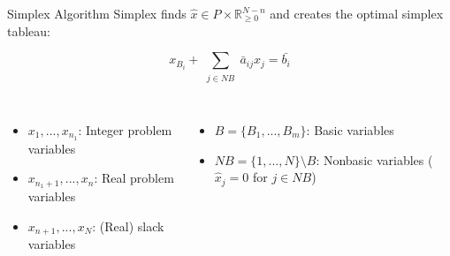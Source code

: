 \begin{frame}{Simplex Algorithm}
Simplex finds $\hat{x} \in P \times \mathbb{R}_{\geq 0}^{N-n}$ and creates the optimal simplex tableau:
\begin{center}
\begin{minipage}{0.8\textwidth}
	\begin{tcolorbox}[colback=white, title={$i-$th row in the simplex tableau}]
    \begin{equation*}
    	x_{B_i} + \sum\limits_{\substack{j \in NB}} \bar{a}_{ij} x_j = \bar{b_i}
    \end{equation*}
    \end{tcolorbox}
\end{minipage}
\end{center}
\begin{columns}
\begin{itemize}
\item $x_1,...,x_{n_1}$: Integer problem variables
\item $x_{n_1+1},...,x_n$: Real problem variables
\item $x_{n+1},...,x_N$: (Real) slack variables
\end{itemize}

\begin{itemize}
\item $B=\{B_1,...,B_m\}$: Basic variables
\item $NB = \{1,...,N\} \setminus B$: Nonbasic variables ($\hat{x}_j=0$ for $j \in NB$)
\end{itemize}
\end{columns}
\end{frame}

